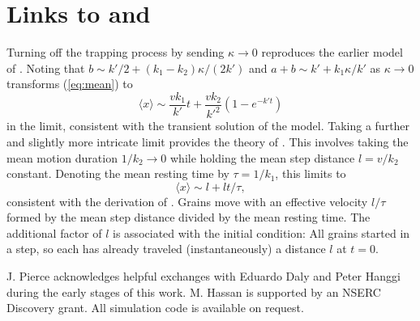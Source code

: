 \documentclass[]{agujournal2018}
\newcommand\be{\begin{equation}}
\newcommand\ee{\end{equation}}
\newcommand\bra{\langle}
\newcommand\ket{\rangle}
\begin{document}
\section{Links to \citet{Einstein1937} and \citet{Lisle1998}}
Turning off the trapping process by sending $\kappa \rightarrow 0 $ reproduces the earlier model of \citet{Lisle1998}. 
Noting that $b \sim k'/2 + (k_1-k_2)\kappa/(2k')$ and $a+b \sim k' + k_1\kappa/k'$ as $\kappa \rightarrow 0$ transforms (\ref{eq:mean}) to 
\be \bra x \ket \sim  \frac{vk_1}{k'}t + \frac{vk_2}{k'^2}(1-e^{-k't})\ee
in the limit, consistent with the transient solution of the \citet{Lisle1998} model.
Taking a further and slightly more intricate limit provides the theory of \citet{Einstein1937}. This involves taking the mean motion duration $1/k_2 \rightarrow 0$ while holding the mean step distance $l=v/k_2$ constant.
Denoting the mean resting time by $\tau=1/k_1$, this limits to
\be \bra x \ket \sim l + lt/\tau,\ee
consistent with the derivation of \citet{Einstein1937}.
Grains move with an effective velocity $l/\tau$ formed by the mean step distance divided by the mean resting time.
The additional factor of $l$ is associated with the initial condition: All grains started in a step, so each has already traveled (instantaneously) a distance $l$ at $t=0$.


\acknowledgments
J. Pierce acknowledges helpful exchanges with Eduardo Daly and Peter Hanggi during the early stages of this work. M. Hassan is supported by an NSERC Discovery grant. All simulation code is available on request.


\end{document}
